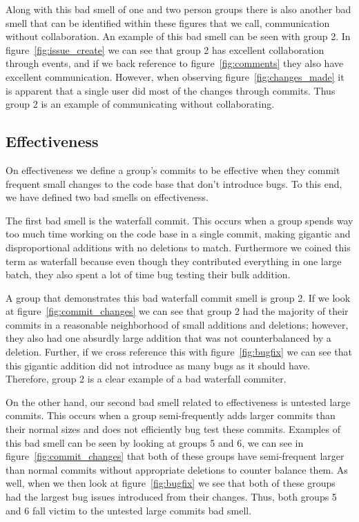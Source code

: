 \documentclass{acm_proc_article-sp}
\begin{document}
Along with this bad smell of one and two person groups there is also another bad smell that can be identified within these figures that we call, communication without collaboration. An example of this bad smell can be seen with group 2. In figure~\ref{fig:issue_create} we can see that group 2 has excellent collaboration through events, and if we back reference to figure~\ref{fig:comments} they also have excellent communication. However, when observing figure~\ref{fig:changes_made} it is apparent that a single user did most of the changes through commits. Thus group 2 is an example of communicating without collaborating.

\subsection{Effectiveness}

On effectiveness we define a group's commits to be effective when they commit frequent small changes to the code base that don't introduce bugs. To this end, we have defined two bad smells on effectiveness. 

The first bad smell is the waterfall commit. This occurs when a group spends way too much time working on the code base in a single commit, making gigantic and disproportional additions with no deletions to match. Furthermore we coined this term as waterfall because even though they contributed everything in one large batch, they also spent a lot of time bug testing their bulk addition. 

A group that demonstrates this bad waterfall commit smell is group 2. If we look at figure~\ref{fig:commit_changes} we can see that group 2 had the majority of their commits in a reasonable neighborhood of small additions and deletions; however, they also had one absurdly large addition that was not counterbalanced by a deletion. Further, if we cross reference this with figure~\ref{fig:bugfix} we can see that this gigantic addition did not introduce as many bugs as it should have. Therefore, group 2 is a clear example of a bad waterfall commiter.

On the other hand, our second bad smell related to effectiveness is untested large commits. This occurs when a group semi-frequently adds larger commits than their normal sizes and does not efficiently bug test these commits. Examples of this bad smell can be seen by looking at groups 5 and 6, we can see in figure~\ref{fig:commit_changes} that both of these groups have semi-frequent larger than normal commits without appropriate deletions to counter balance them. As well, when we then look at figure~\ref{fig:bugfix} we see that both of these groups had the largest bug issues introduced from their changes. Thus, both groups 5 and 6 fall victim to the untested large commits bad smell.
\end{document}
